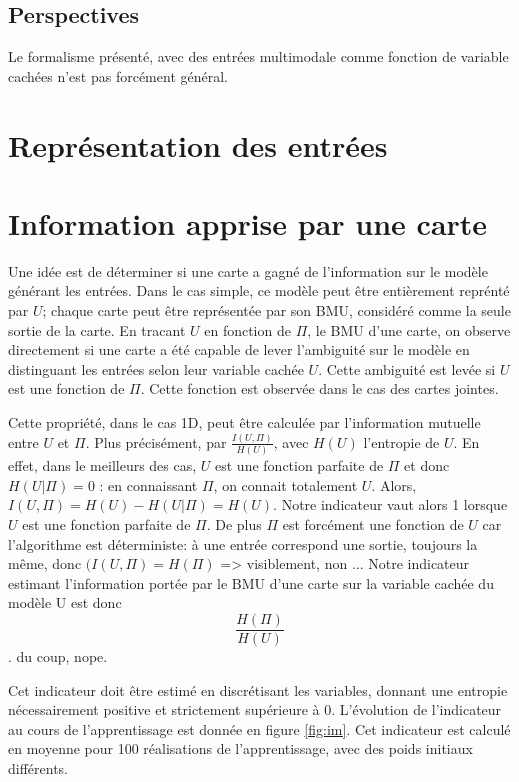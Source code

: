 \subsection{Perspectives}

Le formalisme présenté, avec des entrées multimodale comme fonction de variable cachées n'est pas forcément général.  

\section{Représentation des entrées}



\section{Information apprise par une carte}

Une idée est de déterminer si une carte a gagné de l'information sur le modèle générant les entrées. Dans le cas simple, ce modèle peut être entièrement reprénté par $U$; chaque carte peut être représentée par son BMU, considéré comme la seule sortie de la carte. 
En tracant $U$ en fonction de $\Pi$, le BMU d'une carte, on observe directement si une carte a été capable de lever l'ambiguité sur le modèle en distinguant les entrées selon leur variable cachée $U$. Cette ambiguité est levée si $U$ est une fonction de $\Pi$. Cette fonction est observée dans le cas des cartes jointes.

Cette propriété, dans le cas 1D, peut être calculée par l'information mutuelle entre $U$ et $\Pi$. Plus précisément, par $\frac{I(U,\Pi)}{H(U)}$, avec $H(U)$ l'entropie de $U$. 
En effet, dans le meilleurs des cas, $U$ est une fonction parfaite de $\Pi$ et donc $H(U|\Pi ) = 0$ : en connaissant $\Pi$, on connait totalement $U$. Alors, $I(U,\Pi) = H(U) - H(U| \Pi) = H(U)$. 
Notre indicateur vaut alors 1 lorsque $U$ est une fonction parfaite de $\Pi$.
De plus $\Pi$ est forcément une fonction de $U$ car l'algorithme est déterministe: à une entrée correspond une sortie, toujours la même, donc $(I(U, \Pi) = H(\Pi)$ => visiblement, non ... Notre indicateur estimant l'information portée par le BMU d'une carte sur la variable cachée du modèle U est donc $$\frac{H(\Pi)}{H(U)}$$.
du coup, nope. 


Cet indicateur doit être estimé en discrétisant les variables, donnant une entropie nécessairement positive et strictement supérieure à 0.
L'évolution de l'indicateur au cours de l'apprentissage est donnée en figure \ref{fig:im}. Cet indicateur est calculé en moyenne pour 100 réalisations de l'apprentissage, avec des poids initiaux différents. 

